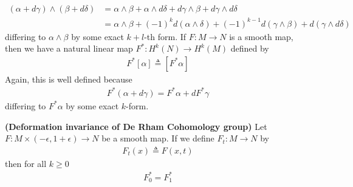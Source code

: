 \documentclass{report}
\begin{document}
\begin{mdframed}
\begin{align*}
  (\alpha + d\gamma )\wedge  (\beta  + d\delta)&= \alpha \wedge  \beta + \alpha \wedge  d \delta + d\gamma  \wedge  \beta  + d\gamma   \wedge  d\delta     \\
  &= \alpha \wedge  \beta  + (-1)^kd(\alpha \wedge  \delta )  + (-1)^{k-1}d (\gamma \wedge  \beta  )+d(\gamma  \wedge  d \delta )
\end{align*}
differing to $\alpha \wedge  \beta $ by some exact $k+l$-th form. If $F:M\rightarrow N$ is a smooth map, then we have a natural linear map $F^*:H^k(N)\rightarrow H^k(M)$ defined by 
\begin{align*}
F^* [\alpha ]\triangleq [F^* \alpha ]
\end{align*}
Again, this is well defined because 
\begin{align*}
F^*(\alpha +d \gamma )= F^* \alpha +d F^* \gamma  
\end{align*}
differing to $F^*\alpha $ by some exact $k$-form. 
\end{mdframed}
\begin{theorem}
\label{PPL}
\textbf{(Deformation invariance of De Rham Cohomology group)} Let $F:M\times  (-\epsilon  ,1+\epsilon )\rightarrow N$ be a smooth map. If we define $F_t:M\rightarrow N$ by 
\begin{align*}
F_t(x)\triangleq F(x,t)
\end{align*}
then for all $k\geq 0$
\begin{align*}
F_0^*=F_1^*
\end{align*}
\end{theorem}
\end{document}
